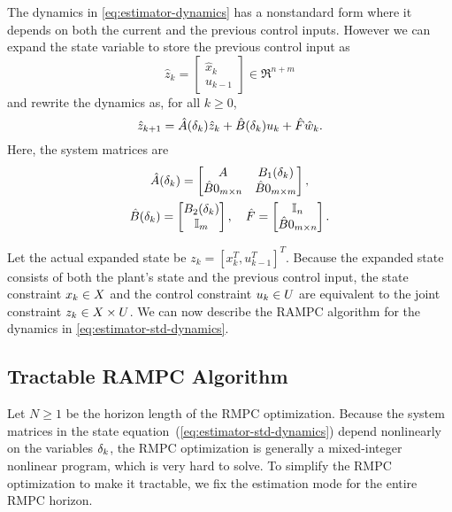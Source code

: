 The dynamics in \eqref{eq:estimator-dynamics} has a nonstandard form
where it depends on both the current and the previous control inputs.
However we can expand the state variable to store the previous control
input as
\[
\hat{z}_{k}=\begin{bmatrix}\hat{x}_{k}\\
u_{k-1}
\end{bmatrix}\in\Re^{n+m}
\]
and rewrite the dynamics as, for all $k\geq0$,
\begin{equation}
\hat{z}_{k+1}=\hat{A}(\delta_k)\hat{z}_{k}+\hat{B}(\delta_k)u_{k}+\hat{F}\hat{w}_{k}\text{.}\label{eq:estimator-std-dynamics}
\end{equation}
Here, the system matrices are
\begin{equation}
\begin{gathered}
\hat{A}(\delta_k)=\begin{bmatrix}A & B_{1}(\delta_k)\\
\hat{B}{0}_{m\times n} & \hat{B}{0}_{m\times m}
\end{bmatrix},\\
\hat{B}(\delta_k)=\begin{bmatrix}B_{2}(\delta_k)\\
\mathbb{I}_{m}
\end{bmatrix},\quad\hat{F}=\begin{bmatrix}\mathbb{I}_{n}\\
\hat{B}{0}_{m\times n}
\end{bmatrix}\text{.}
\end{gathered}
\label{eq:lifted-matrices}
\end{equation}

Let the actual expanded state be $z_{k}=\left[x_{k}^{T},u_{k-1}^{T}\right]^{T}$.
Because the expanded state consists of both the plant's state and
the previous control input, the state constraint $x_{k}\in X$
and the control constraint $u_{k}\in U$ are equivalent to the
joint constraint $z_{k}\in X\times U$. We can now describe
the RAMPC algorithm for the dynamics in \eqref{eq:estimator-std-dynamics}.


\subsection{Tractable RAMPC Algorithm}

Let $N\geq1$ be the horizon length of the RMPC optimization. 
Because the system
matrices in the state equation~(\ref{eq:estimator-std-dynamics})
depend nonlinearly on the variables $\delta_k$, the RMPC optimization
is generally a mixed-integer nonlinear program, which is very hard
to solve. To simplify the RMPC optimization to make it tractable, we fix the estimation mode for the entire RMPC horizon.

